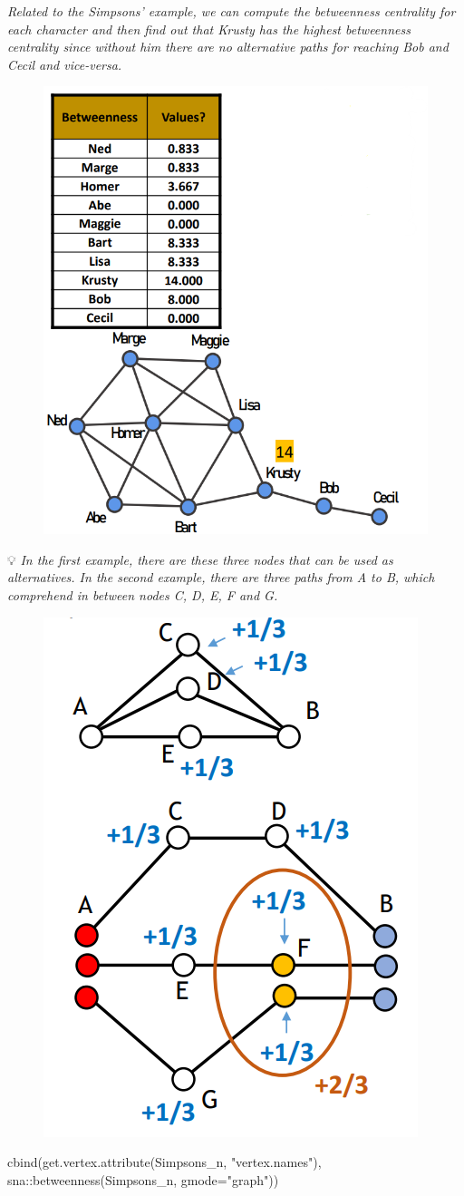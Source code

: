 \documentclass[
  notitlepage,
  onecolumn,
  openany]{book}
\newenvironment{Shaded}{\begin{snugshade}}{\end{snugshade}}
\newcommand{\AttributeTok}[1]{\textcolor[rgb]{0.77,0.63,0.00}{#1}}
\newcommand{\FunctionTok}[1]{\textcolor[rgb]{0.00,0.00,0.00}{#1}}
\newcommand{\NormalTok}[1]{#1}
\newcommand{\SpecialCharTok}[1]{\textcolor[rgb]{0.00,0.00,0.00}{#1}}
\newcommand{\StringTok}[1]{\textcolor[rgb]{0.31,0.60,0.02}{#1}}
\begin{document}
\emph{Related to the Simpsons' example, we can compute the betweenness centrality for each character and then find out that Krusty has the highest betweenness centrality since without him there are no alternative paths for reaching Bob and Cecil and vice-versa.}

\begin{figure}[h!]

{\centering \includegraphics[width=0.5\linewidth]{images/04-Centrality/Untitled 5} 

}

\end{figure}

💡 \emph{In the first example, there are these three nodes that can be used as alternatives. In the second example, there are three paths from A to B, which comprehend in between nodes C, D, E, F and G.}

\begin{figure}[h!]

{\centering \includegraphics[width=0.3\linewidth]{images/04-Centrality/Untitled 6} 

}

\end{figure}

\begin{Shaded}
\begin{Highlighting}[]
\FunctionTok{cbind}\NormalTok{(}\FunctionTok{get.vertex.attribute}\NormalTok{(Simpsons\_n, }\StringTok{"vertex.names"}\NormalTok{),}
\NormalTok{      sna}\SpecialCharTok{::}\FunctionTok{betweenness}\NormalTok{(Simpsons\_n, }\AttributeTok{gmode=}\StringTok{"graph"}\NormalTok{))}
\end{Highlighting}
\end{Shaded}
\end{document}
